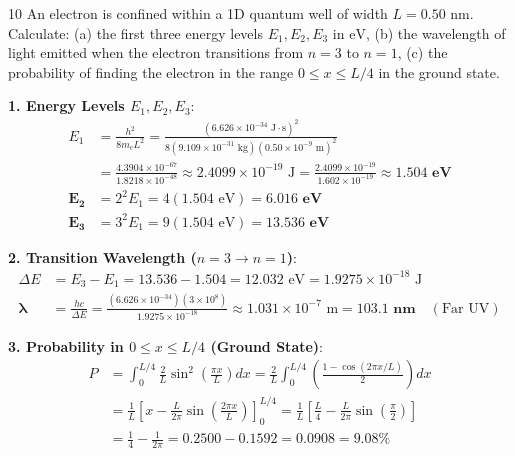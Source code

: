 \begin{theoryq}{10}
An electron is confined within a 1D quantum well of width $L = 0.50\text{ nm}$. Calculate: (a) the first three energy levels $E_1, E_2, E_3$ in $\text{eV}$, (b) the wavelength of light emitted when the electron transitions from $n=3$ to $n=1$, (c) the probability of finding the electron in the range $0 \le x \le L/4$ in the ground state.
\end{theoryq}
\begin{theorysol}
\textbf{1. Energy Levels $E_1, E_2, E_3$}:
\begin{align*}
E_1 &= \frac{h^2}{8 m_e L^2} = \frac{(6.626 \times 10^{-34}\text{ J}\cdot\text{s})^2}{8(9.109 \times 10^{-31}\text{ kg})(0.50 \times 10^{-9}\text{ m})^2} \\
&= \frac{4.3904 \times 10^{-67}}{1.8218 \times 10^{-48}} \approx 2.4099 \times 10^{-19}\text{ J} = \frac{2.4099 \times 10^{-19}}{1.602 \times 10^{-19}} \approx \mathbf{1.504\text{ eV}} \\
\mathbf{E_2} &= 2^2 E_1 = 4(1.504\text{ eV}) = \mathbf{6.016\text{ eV}} \\
\mathbf{E_3} &= 3^2 E_1 = 9(1.504\text{ eV}) = \mathbf{13.536\text{ eV}}
\end{align*}

\textbf{2. Transition Wavelength ($n=3 \to n=1$)}:
\begin{align*}
\Delta E &= E_3 - E_1 = 13.536 - 1.504 = 12.032\text{ eV} = 1.9275 \times 10^{-18}\text{ J} \\
\mathbf{\lambda} &= \frac{h c}{\Delta E} = \frac{(6.626 \times 10^{-34})(3 \times 10^8)}{1.9275 \times 10^{-18}} \approx 1.031 \times 10^{-7}\text{ m} = \mathbf{103.1\text{ nm}} \quad (\text{Far UV})
\end{align*}

\textbf{3. Probability in $0 \le x \le L/4$ (Ground State)}:
\begin{align*}
P &= \int_0^{L/4} \frac{2}{L}\sin^2\left(\frac{\pi x}{L}\right)dx = \frac{2}{L}\int_0^{L/4} \left(\frac{1 - \cos(2\pi x/L)}{2}\right)dx \\
&= \frac{1}{L}\left[ x - \frac{L}{2\pi}\sin\left(\frac{2\pi x}{L}\right) \right]_0^{L/4} = \frac{1}{L}\left[ \frac{L}{4} - \frac{L}{2\pi}\sin\left(\frac{\pi}{2}\right) \right] \\
&= \frac{1}{4} - \frac{1}{2\pi} = 0.2500 - 0.1592 = \mathbf{0.0908 = 9.08\%}
\end{align*}
\end{theorysol}
\vspace{4mm}

